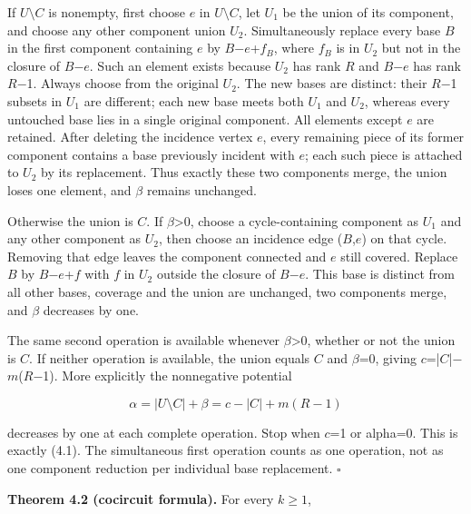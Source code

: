 \documentclass[11pt]{article}
\begin{document}
If \(U\setminus C\) is nonempty, first choose \(e\) in \(U\setminus C\), let \(U_1\) be the union of its component, and choose any other component union \(U_2\). Simultaneously replace every base \(B\) in the first component containing \(e\) by \(B\)\ensuremath{-}\(e\)+\(f_B\), where \(f_B\) is in \(U_2\) but not in the closure of \(B\)\ensuremath{-}\(e\). Such an element exists because \(U_2\) has rank \(R\) and \(B\)\ensuremath{-}\(e\) has rank \(R\)\ensuremath{-}1. Always choose from the original \(U_2\). The new bases are distinct: their \(R\)\ensuremath{-}1 subsets in \(U_1\) are different; each new base meets both \(U_1\) and \(U_2\), whereas every untouched base lies in a single original component. All elements except \(e\) are retained. After deleting the incidence vertex \(e\), every remaining piece of its former component contains a base previously incident with \(e\); each such piece is attached to \(U_2\) by its replacement. Thus exactly these two components merge, the union loses one element, and \(\beta\) remains unchanged.

Otherwise the union is \(C\). If \(\beta\)>0, choose a cycle-containing component as \(U_1\) and any other component as \(U_2\), then choose an incidence edge (\(B\),\(e\)) on that cycle. Removing that edge leaves the component connected and \(e\) still covered. Replace \(B\) by \(B\)\ensuremath{-}\(e\)+\(f\) with \(f\) in \(U_2\) outside the closure of \(B\)\ensuremath{-}\(e\). This base is distinct from all other bases, coverage and the union are unchanged, two components merge, and \(\beta\) decreases by one.

The same second operation is available whenever \(\beta\)>0, whether or not the union is \(C\). If neither operation is available, the union equals \(C\) and \(\beta\)=0, giving \(c\)=|\(C\)|\ensuremath{-}\(m\)(\(R\)\ensuremath{-}1). More explicitly the nonnegative potential

\[
\alpha=|U\setminus C|+\beta=c-|C|+m(R-1)
\]

decreases by one at each complete operation. Stop when \(c\)=1 or alpha=0. This is exactly (4.1). The simultaneous first operation counts as one operation, not as one component reduction per individual base replacement. \hfill\ensuremath{\square}

\textbf{Theorem 4.2 (cocircuit formula).} For every \(k\ge1\),
\end{document}
